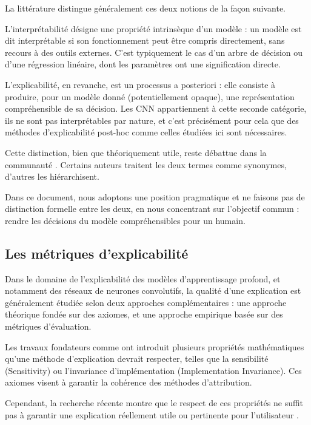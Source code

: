 \documentclass{ir}
\begin{document}
La littérature distingue généralement ces deux notions de la façon suivante.

L'interprétabilité désigne une propriété intrinsèque d'un modèle : un modèle est dit interprétable si son fonctionnement peut être compris directement, sans recours à des outils externes.
C'est typiquement le cas d'un arbre de décision ou d'une régression linéaire, dont les paramètres ont une signification directe.

L'explicabilité, en revanche, est un processus a posteriori : elle consiste à produire, pour un modèle donné (potentiellement opaque), une représentation compréhensible de sa décision.
Les CNN appartiennent à cette seconde catégorie, ils ne sont pas interprétables par nature, et c'est précisément pour cela que des méthodes d'explicabilité post-hoc comme celles étudiées ici sont nécessaires.

Cette distinction, bien que théoriquement utile, reste débattue dans la communauté \cite{cao25slre}.
Certains auteurs traitent les deux termes comme synonymes, d'autres les hiérarchisent.

Dans ce document, nous adoptons une position pragmatique et ne faisons pas de distinction formelle entre les deux, en nous concentrant sur l'objectif commun : rendre les décisions du modèle compréhensibles pour un humain.

\subsection{Les métriques d'explicabilité}\label{subsec:metriques}

Dans le domaine de l'explicabilité des modèles d'apprentissage profond, et notamment des réseaux de neurones convolutifs, la qualité d'une explication est généralement étudiée selon deux approches complémentaires : une approche théorique fondée sur des axiomes, et une approche empirique basée sur des métriques d'évaluation.

Les travaux fondateurs comme \cite{sundararajan2017axiomatic} ont introduit plusieurs propriétés mathématiques qu'une méthode d'explication devrait respecter, telles que la sensibilité (Sensitivity) ou l'invariance d'implémentation (Implementation Invariance). Ces axiomes visent à garantir la cohérence des méthodes d'attribution.

Cependant, la recherche récente montre que le respect de ces propriétés ne suffit pas à garantir une explication réellement utile ou pertinente pour l'utilisateur \cite{nauta2022xai}.
\end{document}
